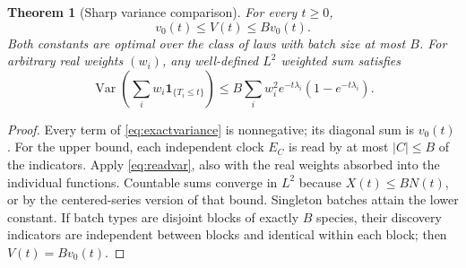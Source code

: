 \documentclass[11pt]{article}
\numberwithin{equation}{section}
\newtheorem{theorem}{Theorem}[section]
\theoremstyle{definition}
\theoremstyle{remark}
\newcommand{\ind}{\mathbf 1}
\newcommand{\Var}{\operatorname{Var}}
\begin{document}
\begin{theorem}[Sharp variance comparison]\label{thm:varcomparison}
For every $t\ge0$,
\begin{equation}\label{eq:sharpcomparison}
 v_0(t)\le V(t)\le Bv_0(t).
\end{equation}
Both constants are optimal over the class of laws with batch size at most $B$.
For arbitrary real weights $(w_i)$, any well-defined $L^2$ weighted sum satisfies
\begin{equation}\label{eq:signedweightedvariance}
 \Var\left(\sum_iw_i\ind_{\{T_i\le t\}}\right)
 \le B\sum_iw_i^2e^{-t\lambda_i}(1-e^{-t\lambda_i}).
\end{equation}
\end{theorem}
\begin{proof}
Every term of \eqref{eq:exactvariance} is nonnegative; its diagonal sum is
$v_0(t)$. For the upper bound, each independent clock $E_C$ is read by at most
$|C|\le B$ of the indicators. Apply \eqref{eq:readvar}, also with the real
weights absorbed into the individual functions. Countable sums converge in
$L^2$ because $X(t)\le BN(t)$, or by the centered-series version of that bound.
Singleton batches attain the lower constant. If batch types are disjoint
blocks of exactly $B$ species, their discovery indicators are independent
between blocks and identical within each block; then $V(t)=Bv_0(t)$.
\end{proof}
\end{document}
